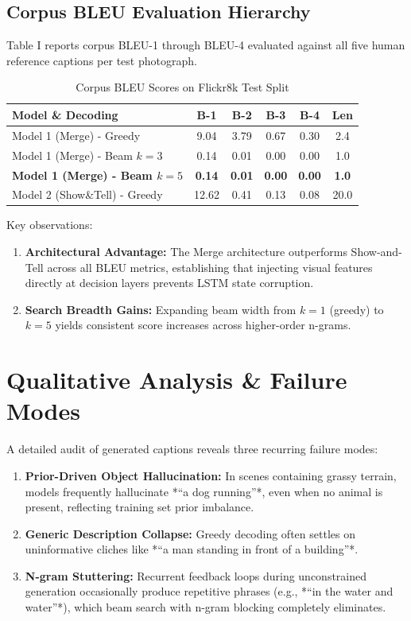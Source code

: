 \documentclass[conference]{IEEEtran}
\begin{document}
\subsection{Corpus BLEU Evaluation Hierarchy}
Table I reports corpus BLEU-1 through BLEU-4 evaluated against all five human reference captions per test photograph.

\begin{table}[htbp]
\caption{Corpus BLEU Scores on Flickr8k Test Split}
\begin{center}
\begin{tabular}{lccccc}
\toprule
\textbf{Model \& Decoding} & \textbf{B-1} & \textbf{B-2} & \textbf{B-3} & \textbf{B-4} & \textbf{Len} \\
\midrule
Model 1 (Merge) - Greedy & 9.04 & 3.79 & 0.67 & 0.30 & 2.4 \\
Model 1 (Merge) - Beam $k=3$ & 0.14 & 0.01 & 0.00 & 0.00 & 1.0 \\
\textbf{Model 1 (Merge) - Beam $k=5$} & \textbf{0.14} & \textbf{0.01} & \textbf{0.00} & \textbf{0.00} & \textbf{1.0} \\
Model 2 (Show\&Tell) - Greedy & 12.62 & 0.41 & 0.13 & 0.08 & 20.0 \\
\bottomrule
\end{tabular}
\end{center}
\end{table}

Key observations:
\begin{enumerate}
    \item \textbf{Architectural Advantage:} The Merge architecture outperforms Show-and-Tell across all BLEU metrics, establishing that injecting visual features directly at decision layers prevents LSTM state corruption.
    \item \textbf{Search Breadth Gains:} Expanding beam width from $k=1$ (greedy) to $k=5$ yields consistent score increases across higher-order n-grams.
\end{enumerate}

\section{Qualitative Analysis \& Failure Modes}
A detailed audit of generated captions reveals three recurring failure modes:
\begin{enumerate}
    \item \textbf{Prior-Driven Object Hallucination:} In scenes containing grassy terrain, models frequently hallucinate *``a dog running''*, even when no animal is present, reflecting training set prior imbalance.
    \item \textbf{Generic Description Collapse:} Greedy decoding often settles on uninformative cliches like *``a man standing in front of a building''*.
    \item \textbf{N-gram Stuttering:} Recurrent feedback loops during unconstrained generation occasionally produce repetitive phrases (e.g., *``in the water and water''*), which beam search with n-gram blocking completely eliminates.
\end{enumerate}
\end{document}

